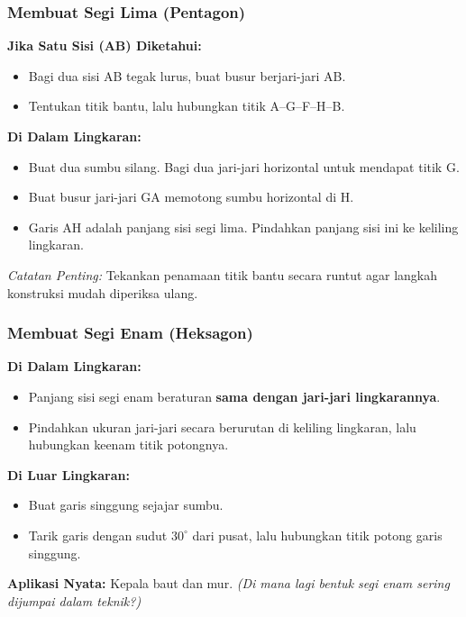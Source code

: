 \documentclass[../gbr_teknik.tex]{subfiles}
\begin{document}
\begin{frame}[mytitle=standard]
	\frametitle{Membuat Segi Lima (Pentagon)}

	\textbf{Jika Satu Sisi (AB) Diketahui:}
	\begin{itemize}
		\item Bagi dua sisi AB tegak lurus, buat busur berjari-jari AB.
		\item Tentukan titik bantu, lalu hubungkan titik A–G–F–H–B.
	\end{itemize}

	\textbf{Di Dalam Lingkaran:}
	\begin{itemize}
		\item Buat dua sumbu silang. Bagi dua jari-jari horizontal untuk mendapat titik G.
		\item Buat busur jari-jari GA memotong sumbu horizontal di H.
		\item Garis AH adalah panjang sisi segi lima. Pindahkan panjang sisi ini ke keliling lingkaran.
	\end{itemize}

	\textit{Catatan Penting:} Tekankan penamaan titik bantu secara runtut agar langkah konstruksi mudah diperiksa ulang.
\end{frame}

\begin{frame}[mytitle=standard]
	\frametitle{Membuat Segi Enam (Heksagon)}

	\textbf{Di Dalam Lingkaran:}
	\begin{itemize}
		\item Panjang sisi segi enam beraturan \textbf{sama dengan jari-jari lingkarannya}.
		\item Pindahkan ukuran jari-jari secara berurutan di keliling lingkaran, lalu hubungkan keenam titik potongnya.
	\end{itemize}

	\textbf{Di Luar Lingkaran:}
	\begin{itemize}
		\item Buat garis singgung sejajar sumbu.
		\item Tarik garis dengan sudut $30^\circ$ dari pusat, lalu hubungkan titik potong garis singgung.
	\end{itemize}

	\textbf{Aplikasi Nyata:} Kepala baut dan mur. \textit{(Di mana lagi bentuk segi enam sering dijumpai dalam teknik?)}
\end{frame}
\end{document}
